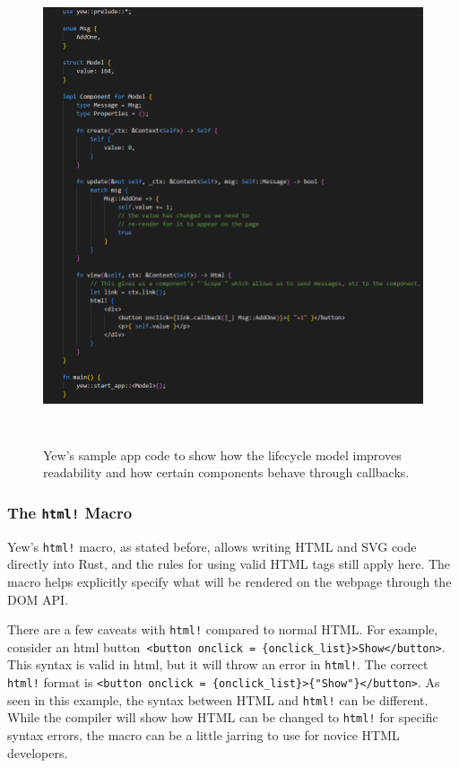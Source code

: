 \documentclass[
    paper=letter,
    parskip=half,
    fontsize=12pt,
    titlepage=firstiscover,
    toc=bibliography,
    numbers=endperiod
]{scrartcl}
\begin{document}
\begin{figure}[H]
    \includegraphics[height=14cm]{yew-sample-code}
    \caption{Yew's sample app code to show how the lifecycle model improves readability and how certain components behave through callbacks.}
\end{figure}

\subsubsection{The \texttt{html!} Macro} \label{subsec:html-macro}

Yew's \texttt{html!} macro, as stated before, allows writing HTML and
SVG code directly into Rust, and the rules for using valid HTML tags
still apply here. The macro helps explicitly specify what will be
rendered on the webpage through the DOM API.

There are a few caveats with \texttt{html!} compared to normal HTML. For
example, consider an html button\texttt{ \textless button onclick =
    \{onclick\_list\}\textgreater Show\textless/button\textgreater}. This
syntax is valid in html, but it will throw an error in \texttt{html!}.
The correct \texttt{html!} format is \texttt{\textless button onclick =
    \{onclick\_list\}\textgreater\{"Show"\}\textless/button\textgreater}. As
seen in this example, the syntax between HTML and \texttt{html!} can be
different. While the compiler will show how HTML can be changed to
\texttt{html!} for specific syntax errors, the macro can be a little
jarring to use for novice HTML developers.
\end{document}
